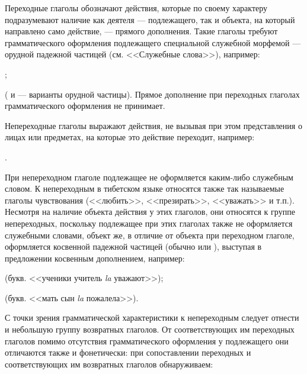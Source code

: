 Переходные глаголы обозначают действия, которые по своему характеру подразумевают наличие как деятеля --- подлежащего, так и объекта, на который направлено само действие, --- прямого дополнения. Такие глаголы требуют грамматического оформления подлежащего специальной служебной морфемой --- орудной падежной частицей (см. <<Служебные слова>>), например:
\begin{prfsample}
	\item {};
	\item {}
\end{prfsample}
( и  --- варианты орудной частицы). Прямое дополнение при переходных глаголах грамматического оформления не принимает.

Непереходные глаголы выражают действия, не вызывая при этом представления о лицах или предметах, на которые это действие переходит, например:
\begin{prfsample}
	\item {}.
\end{prfsample}
При непереходном глаголе подлежащее не оформляется каким-либо служебным словом. К непереходным в тибетском языке относятся также так называемые глаголы чувствования (<<любить>>, <<презирать>>, <<уважать>> и т.п.). Несмотря на наличие объекта действия у этих глаголов, они относятся к группе непереходных, поскольку подлежащее при этих глаголах также не оформляется служебными словами, объект же, в отличие от объекта при переходном глаголе, оформляется косвенной падежной частицей (обычно  или ), выступая в предложении косвенным дополнением, например:
\begin{prfsample}
	\item {} (букв. <<ученики учитель \emph{la} уважают>>);
	\item {} (букв. <<мать сын \emph{la} пожалела>>).
\end{prfsample}

С точки зрения грамматической характеристики к непереходным следует отнести и небольшую группу возвратных глаголов. От соответствующих им переходных глаголов помимо отсутствия грамматического оформления у подлежащего они отличаются также и фонетически: при сопоставлении переходных и соответствующих им возвратных глаголов обнаруживаем:

